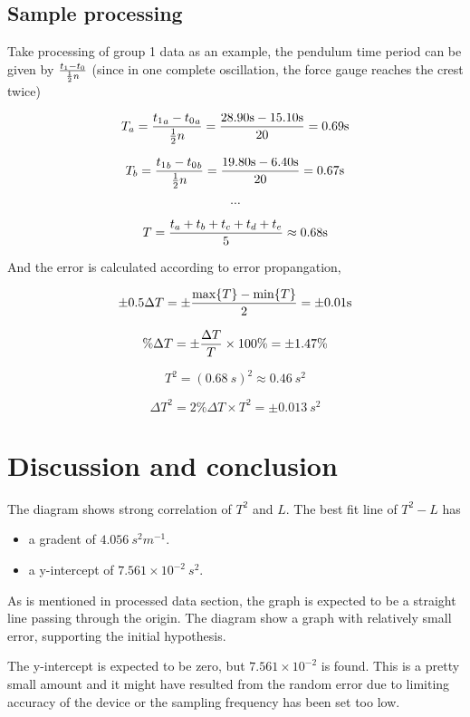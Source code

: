 \documentclass[a4paper]{article}
\begin{document}
\subsection{Sample processing}

Take processing of group 1 data as an example, the pendulum time period can be given by $t_1-t_0\over \frac{1}{2} n$ (since in one complete oscillation, the force gauge reaches the crest twice)

$$T_a = {{t_1}_a - {t_0}_a \over \frac{1}{2}n} = {28.90 \SI{}{s} - 15.10 \SI{}{s} \over 20} = 0.69 \SI{}{s}$$

$$T_b = {{t_1}_b - {t_0}_b \over \frac{1}{2}n} ={ 19.80 \SI{}{s} - 6.40 \SI{}{s} \over 20} = 0.67 \SI{}{s}$$

$$\cdots$$

$$T = {t_a + t_b + t_c + t_d + t_e \over 5} \approx 0.68 \SI{}{s}$$

And the error is calculated according to error propangation,

$$\pm 0.5 \Delta T = \pm {\max\{T\} - \min\{T\} \over 2} = \pm 0.01 \SI{}{s}$$

$$\%\Delta T = \pm {\Delta T \over T} \times 100\% = \pm 1.47\%$$

$$T^2 = (0.68 \SI{}{s})^2 \approx 0.46 \SI{}{s^2}$$

$$\Delta T^2 = 2\%\Delta T \times T^2 = \pm 0.013 \SI{}{s^2}$$

\section{Discussion and conclusion}

The diagram shows strong correlation of $T^2$ and $L$. The best fit line of $T^2 - L$ has 

\begin{itemize}
    \item a gradent of $4.056 \SI{}{s^2m^{-1}}$.
    \item a y-intercept of $7.561\times 10^{-2} \SI{}{s^2}$.
\end{itemize}

As is mentioned in processed data section, the graph is expected to be a straight line passing through the origin. The diagram show a graph with relatively small error, supporting the initial hypothesis. 

The y-intercept is expected to be zero, but $7.561\times 10^{-2}$ is found. This is a pretty small amount and it might have resulted from the random error due to limiting accuracy of the device or the sampling frequency has been set too low.
\end{document}
